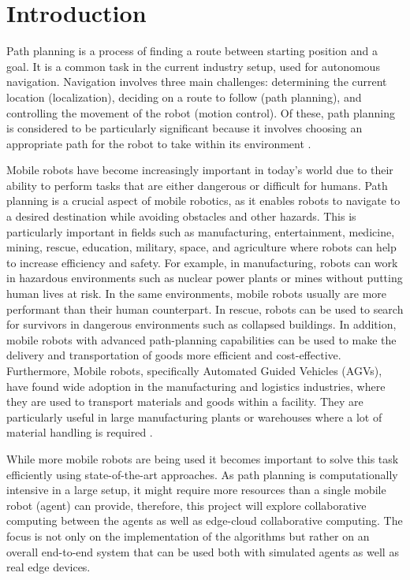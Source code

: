 \chapter{Introduction}

Path planning is a process of finding a route between starting position and a goal. It is a common task in the current industry setup, used for autonomous navigation. Navigation involves three main challenges: determining the current location (localization), deciding on a route to follow (path planning), and controlling the movement of the robot (motion control). Of these, path planning is considered to be particularly significant because it involves choosing an appropriate path for the robot to take within its environment \cite{path_lanning_intro}. 

Mobile robots have become increasingly important in today's world due to their ability to perform tasks that are either dangerous or difficult for humans. Path planning is a crucial aspect of mobile robotics, as it enables robots to navigate to a desired destination while avoiding obstacles and other hazards. This is particularly important in fields such as manufacturing, entertainment, medicine, mining, rescue, education, military, space, and agriculture where robots can help to increase efficiency and safety. For example, in manufacturing, robots can work in hazardous environments such as nuclear power plants or mines without putting human lives at risk. In the same environments, mobile robots usually are more performant than their human counterpart. In rescue, robots can be used to search for survivors in dangerous environments such as collapsed buildings. In addition, mobile robots with advanced path-planning capabilities can be used to make the delivery and transportation of goods more efficient and cost-effective. Furthermore, Mobile robots, specifically Automated Guided Vehicles (AGVs), have found wide adoption in the manufacturing and logistics industries, where they are used to transport materials and goods within a facility. They are particularly useful in large manufacturing plants or warehouses where a lot of material handling is required \cite{intro_mobile_robots}. 

While more mobile robots are being used it becomes important to solve this task efficiently using state-of-the-art approaches. As path planning is computationally intensive in a large setup, it might require more resources than a single mobile robot (agent) can provide, therefore, this project will explore collaborative computing between the agents as well as edge-cloud collaborative computing. The focus is not only on the implementation of the algorithms but rather on an overall end-to-end system that can be used both with simulated agents as well as real edge devices.

